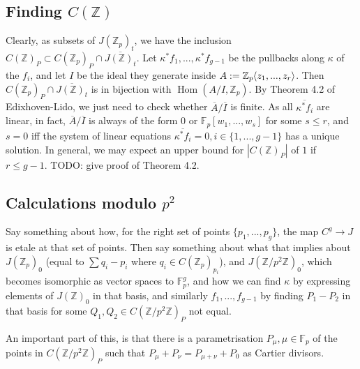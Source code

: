\documentclass{article}
\newcommand{\Z}{\mathbb{Z}}
\newcommand{\F}{\mathbb{F}}
\renewcommand{\angle}[1]{\hspace{-2pt}\left\langle #1 \right\rangle}
\DeclareMathOperator{\Hom}{Hom}
\theoremstyle{plain}
\theoremstyle{definition}
\theoremstyle{remark}
\begin{document}
\subsection{Finding \texorpdfstring{$C(\Z)$}{C(Z)}}
Clearly, as subsets of $J(\Z_p)_t$, we have the inclusion $C(\Z)_P \subset C(\Z_p)_P \cap \overline{J(\Z)_t}$. Let $\kappa^*f_1,...,\kappa^*f_{g-1}$ be the pullbacks along $\kappa$ of the $f_i$, and let $I$ be the ideal they generate inside $A := \Z_p\angle{z_1,...,z_r}$. Then $C(\Z_p)_P \cap \overline{J(\Z)_t}$ is in bijection with $\Hom(A/I,\Z_p)$. By Theorem 4.2 of Edixhoven-Lido, we just need to check whether $\overline{A}/\overline{I}$ is finite. As all $\overline{\kappa^* f_i}$ are linear, in fact, $\overline{A}/\overline{I}$ is always of the form $0$ or $\F_p[w_1,...,w_s]$ for some $s \leq r$, and $s = 0$ iff the system of linear equations $\overline{\kappa^* f_i} = 0, i \in \{1,...,g-1\}$ has a unique solution. In general, we may expect an upper bound for $|C(\Z)_P|$ of $1$ if $r \leq g-1$.
TODO: give proof of Theorem 4.2.

\subsection{Calculations modulo \texorpdfstring{$p^2$}{p\^2}}
Say something about how, for the right set of points $\{p_1,...,p_g\}$, the map $C^{g} \to J$ is etale at that set of points. Then say something about what that implies about $J(\Z_p)_0$ (equal to $\sum q_i - p_i$ where $q_i \in C(\Z_p)_{p_i}$), and $J(\Z/p^2\Z)_0$, which becomes isomorphic as vector spaces to $\F_p^g$, and how we can find $\kappa$ by expressing elements of $J(\Z)_0$ in that basis, and similarly $f_1,...,f_{g-1}$ by finding $P_1 - P_2$ in that basis for some $Q_1,Q_2 \in C(\Z/p^2\Z)_P$ not equal.

An important part of this, is that there is a parametrisation $P_\mu, \mu \in \F_p$ of the points in $C(\Z/p^2\Z)_P$ such that $P_\mu + P_\nu = P_{\mu + \nu} + P_0$ as Cartier divisors.
\end{document}
